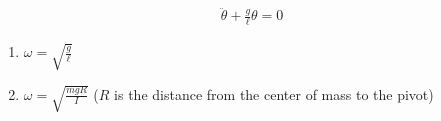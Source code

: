 

\vspace*{\fill}
\centering

\begin{align*}
    \ddot{\theta} + \frac{g}{\ell }\theta = 0 
\end{align*}

\begin{enumerate}
    \item $\displaystyle \omega = \sqrt{\frac{g}{\ell}}$ 
    \item $\displaystyle \omega = \sqrt{\frac{mgR}{I}}$ ($R$ is the distance from the center of mass to the pivot)
\end{enumerate}

\centering
\vspace*{\fill}

